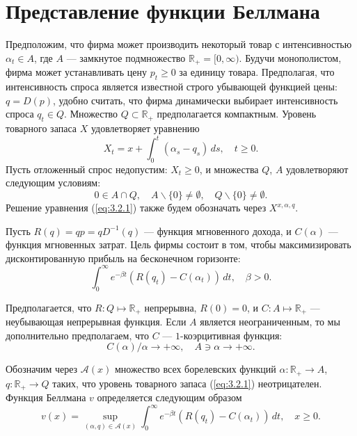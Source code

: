 \section{Представление функции Беллмана} \label{sec:3.2}
Предположим, что фирма может производить некоторый товар с интенсивностью $\alpha_t\in A$, где $A$ --- замкнутое подмножество $\mathbb R_+=[0,\infty)$. Будучи монополистом, фирма может устанавливать цену $p_t\ge 0$ за единицу товара.
Предполагая, что интенсивность спроса является известной строго убывающей функцией цены: $q=D(p)$, удобно считать, что фирма динамически выбирает интенсивность спроса  $q_t\in Q$. Множество $Q\subset\mathbb R_+$ предполагается компактным. Уровень товарного запаса $X$ удовлетворяет уравнению
\begin{equation} \label{eq:3.2.1}
 X_t=x+\int_0^t (\alpha_s-q_s)\,ds,\quad t\ge 0.
\end{equation}
Пусть отложенный спрос недопустим: $X_t\ge 0$, и множества $Q$, $A$ удовлетворяют следующим условиям:
\begin{equation} \label{eq:3.2.2}
 0\in A\cap Q,\quad A\backslash\{0\}\neq\emptyset,\quad Q\backslash\{0\}\neq\emptyset.
\end{equation}
Решение уравнения (\ref{eq:3.2.1}) также будем обозначать через $X^{x,\alpha,q}$.

Пусть $R(q)=qp=qD^{-1}(q)$ --- функция мгновенного дохода, и $C(\alpha)$ --- функция мгновенных затрат. Цель фирмы состоит в том, чтобы максимизировать дисконтированную прибыль на бесконечном горизонте:
$$ \int_0^\infty e^{-\beta t} (R(q_t)-C(\alpha_t))\,dt,\quad \beta>0.$$

Предполагается, что $R:Q\mapsto\mathbb R_+$ непрерывна, $R(0)=0$, и $C:A\mapsto\mathbb R_+$ --- неубывающая непрерывная функция. Если $A$ является неограниченным, то мы дополнительно предполагаем, что $C$ --- $1$-коэрцитивная функция:
\begin{equation} \label{eq:3.2.3}
 C(\alpha)/\alpha\to +\infty,\quad A\ni\alpha\to+\infty.
\end{equation}

Обозначим через $\mathscr A(x)$ множество всех борелевских функций $\alpha:\mathbb R_+\to A$, $q:\mathbb R_+\to Q$ таких, что уровень товарного запаса (\ref{eq:3.2.1}) неотрицателен. Функция Беллмана $v$ определяется следующим образом
\begin{equation} \label{eq:3.2.4}
v(x)=\sup_{(\alpha,q)\in\mathscr A(x)}\int_0^\infty e^{-\beta t} (R(q_t)-C(\alpha_t))\,dt, \quad x\ge 0.
\end{equation}


